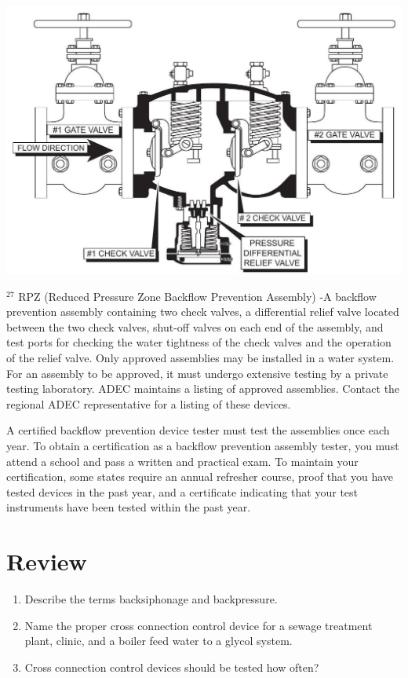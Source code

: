 \documentclass[10pt]{article}
\begin{document}
\includegraphics[max width=\textwidth]{RPZBFPA}

${ }^{27}$ RPZ (Reduced Pressure Zone Backflow Prevention Assembly) -A backflow prevention assembly containing two check valves, a differential relief valve located between the two check valves, shut-off valves on each end of the assembly, and test ports for checking the water tightness of the check valves and the operation of the relief valve. Only approved assemblies may be installed in a water system. For an assembly to be approved, it must undergo extensive testing by a private testing laboratory. ADEC maintains a listing of approved assemblies. Contact the regional ADEC representative for a listing of these devices.

A certified backflow prevention device tester must test the assemblies once each year. To obtain a certification as a backflow prevention assembly tester, you must attend a school and pass a written and practical exam. To maintain your certification, some states require an annual refresher course, proof that you have tested devices in the past year, and a certificate indicating that your test instruments have been tested within the past year.

\section{Review}
\begin{enumerate}
  \item Describe the terms backsiphonage and backpressure.

  \item Name the proper cross connection control device for a sewage treatment plant, clinic, and a boiler feed water to a glycol system.

  \item Cross connection control devices should be tested how often?

\end{enumerate}
\end{document}
